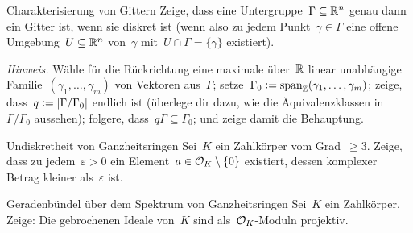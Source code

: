 \documentclass{uebblatt}
\begin{document}
\begin{aufgabe}{Charakterisierung von Gittern}
Zeige, dass eine Untergruppe~$\Gamma \subseteq \mathbb{R}^n$ genau dann ein Gitter
ist, wenn sie diskret ist (wenn also zu jedem Punkt~$\gamma \in \Gamma$ eine
offene Umgebung~$U \subseteq \mathbb{R}^n$ von~$\gamma$ mit~$U \cap \Gamma =
\{\gamma\}$ existiert).

{\tiny\emph{Hinweis.} Wähle für die Rückrichtung eine maximale
über~$\mathbb{R}$ linear unabhängige Familie~$(\gamma_1,\ldots,\gamma_m)$ von Vektoren
aus~$\Gamma$; setze~$\Gamma_0 \vcentcolon=
\operatorname{span}_{\mathbb{Z}}(\gamma_1,\ldots,\gamma_m)$; zeige, dass~$q \vcentcolon=
|\Gamma/\Gamma_0|$ endlich ist (überlege dir dazu, wie die Äquivalenzklassen
in~$\Gamma/\Gamma_0$ aussehen); folgere, dass~$q\Gamma \subseteq \Gamma_0$; und
zeige damit die Behauptung.\par}
\end{aufgabe}

\begin{aufgabe}{Undiskretheit von Ganzheitsringen}
Sei~$K$ ein Zahlkörper vom Grad~$\geq 3$. Zeige, dass zu jedem~$\varepsilon >
0$ ein Element~$a \in \mathcal{O}_K \setminus \{0\}$ existiert, dessen komplexer Betrag
kleiner als~$\varepsilon$ ist.
\end{aufgabe}

\begin{aufgabe*}{Geradenbündel über dem Spektrum von Ganzheitsringen}
Sei~$K$ ein Zahlkörper. Zeige: Die gebrochenen Ideale von~$K$ sind
als~$\mathcal{O}_K$-Moduln projektiv.
\end{aufgabe*}
\end{document}
